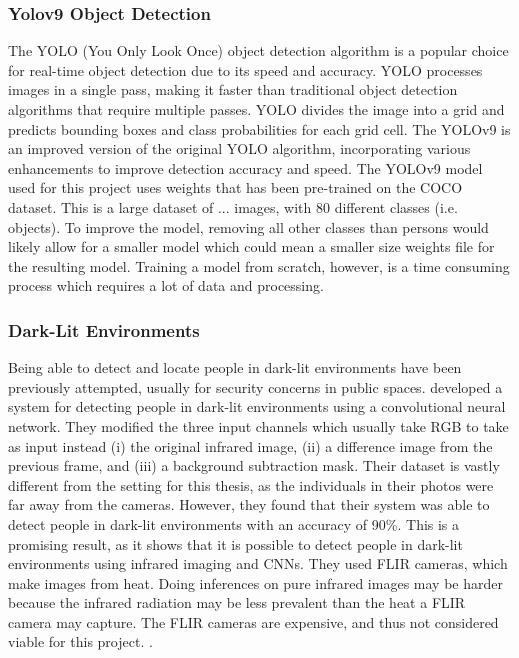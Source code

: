 \subsubsection{Yolov9 Object Detection}
The YOLO (You Only Look Once) object detection algorithm is a popular choice for real-time object detection due to its speed and accuracy. YOLO processes images in a single pass, making it faster than traditional object detection algorithms that require multiple passes. YOLO divides the image into a grid and predicts bounding boxes and class probabilities for each grid cell. The YOLOv9 is an improved version of the original YOLO algorithm, incorporating various enhancements to improve detection accuracy and speed. The YOLOv9 model used for this project uses weights that has been pre-trained on the COCO dataset. This is a large dataset of ... images, with 80 different classes (i.e. objects). To improve the model, removing all other classes than persons would likely allow for a smaller model which could mean a smaller size weights file for the resulting model. Training a model from scratch, however, is a time consuming process which requires a lot of data and processing.




\subsubsection{Dark-Lit Environments}
Being able to detect and locate people in dark-lit environments have been previously attempted, usually for security concerns in public spaces. \citeauthor{pa2020PersonDetectionNightTimeFLIR} developed a system for detecting people in dark-lit environments using a convolutional neural network. They modified the three input channels which usually take RGB to take as input instead (i) the original infrared image, (ii) a difference image from the previous frame, and (iii) a background subtraction mask. Their dataset is vastly different from the setting for this thesis, as the individuals in their photos were far away from the cameras. However, they found that their system was able to detect people in dark-lit environments with an accuracy of 90\%. This is a promising result, as it shows that it is possible to detect people in dark-lit environments using infrared imaging and CNNs. They used FLIR cameras, which make images from heat. Doing inferences on pure infrared images may be harder because the infrared radiation may be less prevalent than the heat a FLIR camera may capture. The FLIR cameras are expensive, and thus not considered viable for this project. 
\cite{pa2020PersonDetectionNightTimeFLIR}. 




